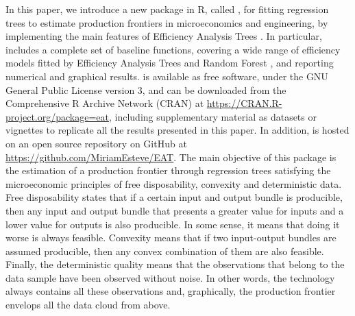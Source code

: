 In this paper, we introduce a new package in R, called , for
fitting regression trees to estimate production frontiers in
microeconomics and engineering, by implementing the main features of
Efficiency Analysis Trees \citep{esteve2020}. In particular, 
includes a complete set of baseline functions, covering a wide range of
efficiency models fitted by Efficiency Analysis Trees \citep{esteve2020}
and Random Forest \citep{esteve2021}, and reporting numerical and
graphical results.  is available as free software, under the
GNU General Public License version 3, and can be downloaded from the
Comprehensive R Archive Network (CRAN) at
\url{https://CRAN.R-project.org/package=eat}, including supplementary
material as datasets or vignettes to replicate all the results presented
in this paper. In addition,  is hosted on an open source
repository on GitHub at \url{https://github.com/MiriamEsteve/EAT}. The
main objective of this package is the estimation of a production
frontier through regression trees satisfying the microeconomic
principles of free disposability, convexity and deterministic data. Free
disposability states that if a certain input and output bundle is
producible, then any input and output bundle that presents a greater
value for inputs and a lower value for outputs is also producible. In
some sense, it means that doing it worse is always feasible. Convexity
means that if two input-output bundles are assumed producible, then any
convex combination of them are also feasible. Finally, the deterministic
quality means that the observations that belong to the data sample have
been observed without noise. In other words, the technology always
contains all these observations and, graphically, the production
frontier envelops all the data cloud from above.

